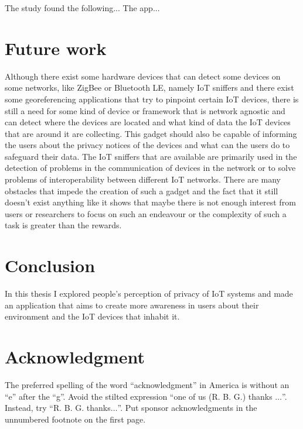 \documentclass[conference]{IEEEtran}
\begin{document}
The study found the following... The app...

\section{Future work}

Although there exist some hardware devices that can detect some devices
on some networks, like ZigBee or Bluetooth LE, namely IoT sniffers and
there exist some georeferencing applications that try to pinpoint certain
IoT devices, there is still a need for some kind of device or framework
that is network agnostic and can detect where the devices are located and
what kind of data the IoT devices that are around it are collecting.
This gadget should also be capable of informing the users about the privacy
notices of the devices and what can the users do to safeguard their data.
The IoT sniffers that are available are primarily used in the detection of
problems in the communication of devices in the network or to solve problems
of interoperability between different IoT networks. There are many obstacles
that impede the creation of such a gadget and the fact that it still doesn't
exist anything like it shows that maybe there is not enough interest from
users or researchers to focus on such an endeavour or the complexity
of such a task is greater than the rewards.

\section{Conclusion}

In this thesis I explored people's perception of privacy of IoT systems and
made an application that aims to create more awareness in users about their
environment and the IoT devices that inhabit it.

\section*{Acknowledgment}

The preferred spelling of the word ``acknowledgment'' in America is without
an ``e'' after the ``g''. Avoid the stilted expression ``one of us (R. B.
G.) thanks $\ldots$''. Instead, try ``R. B. G. thanks$\ldots$''. Put sponsor
acknowledgments in the unnumbered footnote on the first page.



\end{document}
